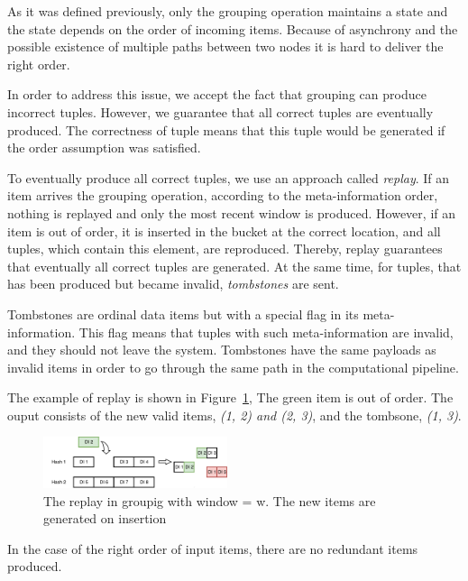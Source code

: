 \label {fs-collision}

As it was defined previously, only the grouping operation maintains a state and the state depends on the order of incoming items. Because of asynchrony and the possible existence of multiple paths between two nodes it is hard to deliver the right order.

In order to address this issue, we accept the fact that grouping can produce incorrect tuples. However, we guarantee that all correct tuples are eventually produced. The correctness of tuple means that this tuple would be generated if the order assumption was satisfied. 

To eventually produce all correct tuples, we use an approach called {\it replay}. If an item arrives the grouping operation, according to the meta-information order, nothing is replayed and only the most recent window is produced. However, if an item is out of order, it is inserted in the bucket at the correct location, and all tuples, which contain this element, are reproduced. Thereby, replay guarantees that eventually all correct tuples are generated. At the same time, for tuples, that has been produced but became invalid, {\it tombstones} are sent.

Tombstones are ordinal data items but with a special flag in its meta-information. This flag means that tuples with such meta-information are invalid, and they should not leave the system. Tombstones have the same payloads as invalid items in order to go through the same path in the computational pipeline.

The example of replay is shown in Figure~\ref{grouping-replaying}, The green item is out of order. The ouput consists of the new valid items, {\it (1, 2) and (2, 3)}, and the tombsone, {\it (1, 3)}.

\begin{figure}[htbp]
  \centering
  \includegraphics[width=0.48\textwidth]{pics/grouping-replaying}
  \caption{The replay in groupig with window = w. The new items are generated on insertion}
  \label {grouping-replaying}
\end{figure}

In the case of the right order of input items, there are no redundant items produced.

